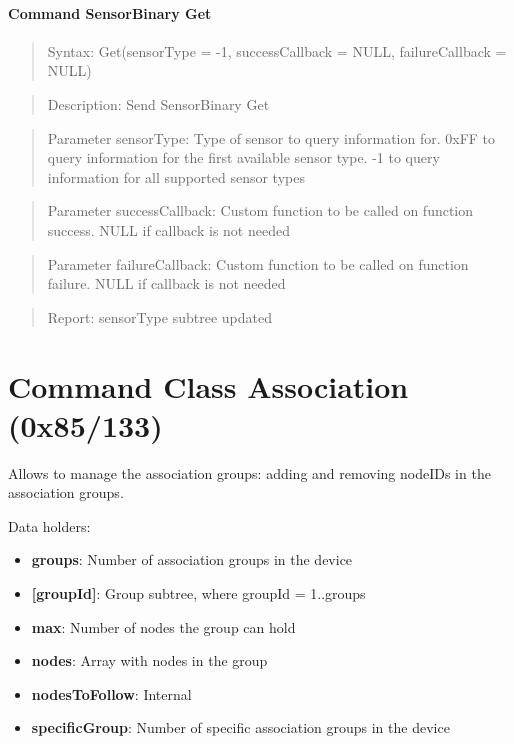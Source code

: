\paragraph{Command SensorBinary Get}
\begin{quote}Syntax: Get(sensorType = -1, successCallback = NULL, failureCallback = NULL)\end{quote}
\begin{quote}Description: Send SensorBinary Get\end{quote}
\begin{quote}Parameter sensorType: Type of sensor to query information for. 0xFF to query information for the first available sensor type. -1 to query information for all supported sensor types\end{quote}
\begin{quote}Parameter successCallback: Custom function to be called on function success. NULL if callback is not needed\end{quote}
\begin{quote}Parameter failureCallback: Custom function to be called on function failure. NULL if callback is not needed\end{quote}
\begin{quote}Report: sensorType subtree updated\end{quote}


\section{Command Class Association (0x85/133)}

Allows to manage the association groups: adding and removing nodeIDs in the association groups.
\newline

\noindent
Data holders:

\begin{itemize}
\item \textbf{groups}: Number of association groups in the device
\item \textbf{[groupId]}: Group subtree, where groupId = 1..groups
\item \qquad\textbf{max}: Number of nodes the group can hold
\item \qquad\textbf{nodes}: Array with nodes in the group
\item \qquad\textbf{nodesToFollow}: Internal
\item \textbf{specificGroup}: Number of specific association groups in the device
\end{itemize}

